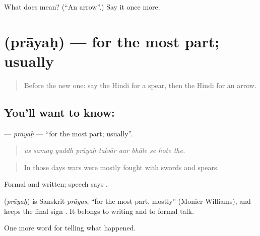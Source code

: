 \begin{tcolorbox}[breakable,colback=teal!4,colframe=teal!35!black,title={Before you move on}]
What does  mean? (\textquotedblleft{}An arrow\textquotedblright{}.) Say it once more.
\end{tcolorbox}
\section[\texorpdfstring{\hi{प्रायः} (prāyaḥ)}{प्रायः (prāyaḥ)}]{ (prāyaḥ) — for the most part; usually}

\label{lesson:HI-C322-prayah}



\begin{quote}
Before the new one: say the Hindi for a spear, then the Hindi for an arrow.
\end{quote}

\subsection*{You'll want to know: }
\textbf{} — \emph{prāyaḥ} — \textquotedblleft{}for the most part; usually\textquotedblright{}.

\begin{quote}
         
\end{quote}

\begin{quote}
\emph{us samay yuddh prāyaḥ talvār aur bhāle se hote the.}
\end{quote}

\begin{quote}
In those days wars were mostly fought with swords and spears.
\end{quote}

Formal and written; speech says .

\begin{cousinweb}
\textbf{} (\emph{prāyaḥ}) is Sanskrit \emph{prāyas}, \textquotedblleft{}for the most part, mostly\textquotedblright{} (Monier-Williams), and keeps the final sign \textbf{}. It belongs to writing and to formal talk.
\end{cousinweb}

\begin{grammarlens}[title={What you've built}]
One more word for telling what happened.
\end{grammarlens}

